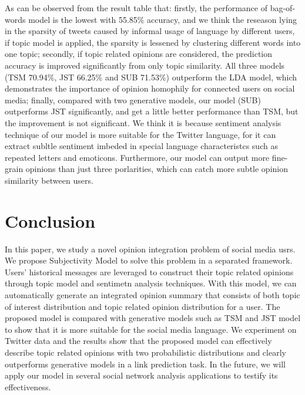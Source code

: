 \documentclass[runningheads,a4paper]{llncs}
\begin{document}
As can be observed from the result table that: firstly, the performance of bag-of-words model is the lowest with 55.85\% accuracy, and we think the reseason lying in the sparsity of tweets caused by informal usage of language by different users, if topic model is applied, the sparsity is lessened by clustering different words into one topic; secondly, if topic related opinions are considered, the prediction accuracy is improved significantly from only topic similarity. All three models (TSM 70.94\%, JST 66.25\% and SUB 71.53\%) outperform the LDA model, which demonstrates the importance of opinion homophily for connected users on social media; finally, compared with two generative models, our model (SUB) outperforms JST significantly, and get a little better performance than TSM, but the improvement is not significant. We think it is because sentiment analysis technique of our model is more suitable for the Twitter language, for it can extract subltle sentiment imbeded in special language characteristcs such as repeated letters and emoticons. Furthermore, our model can output more fine-grain opinions than just three porlarities, which can catch more subtle opinion similarity between users.

\section{Conclusion}
\label{sec6}

In this paper, we study a novel opinion integration problem of social media usrs.
We propose Subjectivity Model to solve this problem in a separated framework. Users' historical messages are leveraged to construct their topic related opinions through topic model and sentimetn analysis techniques. With this model, we can automatically generate an integrated opinion summary that consists of both topic of interest distribution and topic related opinion distribution for a user. The proposed model is compared with generative models such as TSM and JST model to show that it is more suitable for the social media language. We experiment on Twitter data and the results show that the proposed model can effectively describe topic related opinions with two probabilistic distributions and clearly outperforms generative models in a link prediction task.
In the future, we will apply our model in several social network analysis applications to testify its effectiveness.



\end{document}
